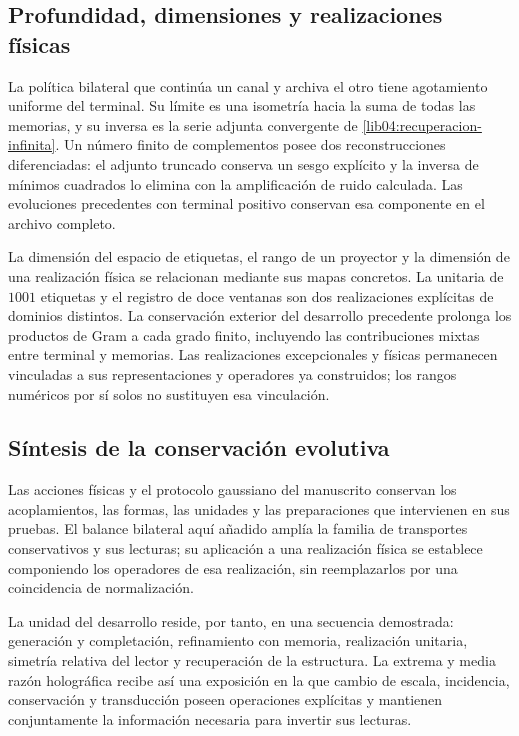 \subsection{Profundidad, dimensiones y realizaciones físicas}
\label{lib06:profundidad}

La política bilateral que continúa un canal y archiva el otro
tiene agotamiento uniforme del terminal. Su límite es una
isometría hacia la suma de todas las memorias, y su inversa es
la serie adjunta convergente de
\eqref{lib04:recuperacion-infinita}. Un número finito de
complementos posee dos reconstrucciones diferenciadas: el
adjunto truncado conserva un sesgo explícito y la inversa de
mínimos cuadrados lo elimina con la amplificación de ruido
calculada. Las evoluciones precedentes con terminal positivo
conservan esa componente en el archivo completo.

La dimensión del espacio de etiquetas, el rango de un proyector y
la dimensión de una realización física se relacionan mediante
sus mapas concretos. La unitaria de \(1001\) etiquetas y el
registro de doce ventanas son dos realizaciones explícitas de
dominios distintos. La conservación exterior del desarrollo
precedente prolonga los productos de Gram a cada grado finito,
incluyendo las contribuciones mixtas entre terminal y memorias.
Las realizaciones excepcionales y físicas permanecen vinculadas
a sus representaciones y operadores ya construidos; los rangos
numéricos por sí solos no sustituyen esa vinculación.

\subsection{Síntesis de la conservación evolutiva}
Las acciones físicas y el protocolo gaussiano del manuscrito
conservan los acoplamientos, las formas, las unidades y las
preparaciones que intervienen en sus pruebas. El balance
bilateral aquí añadido amplía la familia de transportes
conservativos y sus lecturas; su aplicación a una realización
física se establece componiendo los operadores de esa
realización, sin reemplazarlos por una coincidencia de
normalización.

La unidad del desarrollo reside, por tanto, en una secuencia
demostrada: generación y completación, refinamiento con memoria,
realización unitaria, simetría relativa del lector y recuperación
de la estructura. La extrema y media razón holográfica recibe
así una exposición en la que cambio de escala, incidencia,
conservación y transducción poseen operaciones explícitas y
mantienen conjuntamente la información necesaria para invertir
sus lecturas.
